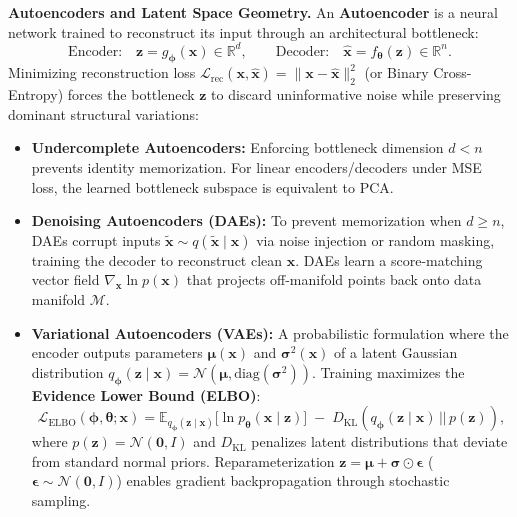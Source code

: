 \documentclass[11pt,a4paper]{article}
\begin{document}
	\textbf{Autoencoders and Latent Space Geometry.} An \textbf{Autoencoder} is a neural network trained to reconstruct its input through an architectural bottleneck:
	\begin{equation}
		\text{Encoder:}\quad \mathbf{z} = g_{\boldsymbol{\phi}}(\mathbf{x}) \in \mathbb{R}^d, \qquad \text{Decoder:}\quad \hat{\mathbf{x}} = f_{\boldsymbol{\theta}}(\mathbf{z}) \in \mathbb{R}^n .
	\end{equation}
	Minimizing reconstruction loss $\mathcal{L}_{\mathrm{rec}}(\mathbf{x}, \hat{\mathbf{x}}) = \|\mathbf{x} - \hat{\mathbf{x}}\|_2^2$ (or Binary Cross-Entropy) forces the bottleneck $\mathbf{z}$ to discard uninformative noise while preserving dominant structural variations:
	\begin{itemize}[nosep]
		\item \textbf{Undercomplete Autoencoders:} Enforcing bottleneck dimension $d < n$ prevents identity memorization. For linear encoders/decoders under MSE loss, the learned bottleneck subspace is equivalent to PCA.
		\item \textbf{Denoising Autoencoders (DAEs):} To prevent memorization when $d \ge n$, DAEs \parencite{vincent2008} corrupt inputs $\tilde{\mathbf{x}} \sim q(\tilde{\mathbf{x}} \mid \mathbf{x})$ via noise injection or random masking, training the decoder to reconstruct clean $\mathbf{x}$. DAEs learn a score-matching vector field $\nabla_{\mathbf{x}} \ln p(\mathbf{x})$ that projects off-manifold points back onto data manifold $\mathcal{M}$.
		\item \textbf{Variational Autoencoders (VAEs):} A probabilistic formulation \parencite{kingma2014} where the encoder outputs parameters $\boldsymbol{\mu}(\mathbf{x})$ and $\boldsymbol{\sigma}^2(\mathbf{x})$ of a latent Gaussian distribution $q_{\boldsymbol{\phi}}(\mathbf{z} \mid \mathbf{x}) = \mathcal{N}(\boldsymbol{\mu}, \mathrm{diag}(\boldsymbol{\sigma}^2))$. Training maximizes the \textbf{Evidence Lower Bound (ELBO)}:
		\begin{equation}
			\mathcal{L}_{\mathrm{ELBO}}(\boldsymbol{\phi}, \boldsymbol{\theta}; \mathbf{x}) = \mathbb{E}_{q_{\boldsymbol{\phi}}(\mathbf{z} \mid \mathbf{x})}\bigl[\ln p_{\boldsymbol{\theta}}(\mathbf{x} \mid \mathbf{z})\bigr] \;-\; D_{\mathrm{KL}}\!\left(q_{\boldsymbol{\phi}}(\mathbf{z} \mid \mathbf{x}) \,||\, p(\mathbf{z})\right),
		\end{equation}
		where $p(\mathbf{z}) = \mathcal{N}(\mathbf{0}, I)$ and $D_{\mathrm{KL}}$ penalizes latent distributions that deviate from standard normal priors. Reparameterization $\mathbf{z} = \boldsymbol{\mu} + \boldsymbol{\sigma} \odot \boldsymbol{\epsilon}$ ($\boldsymbol{\epsilon} \sim \mathcal{N}(\mathbf{0}, I)$) enables gradient backpropagation through stochastic sampling.
	\end{itemize}
	
\end{document}
